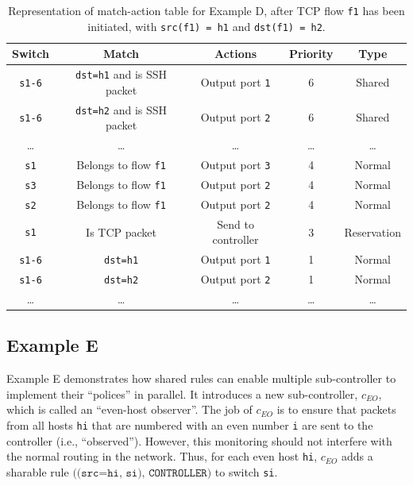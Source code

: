 \documentclass{article}
\begin{document}
\begin{table}
\begin{center}
\begin{tabular}{|c|c|c|c|c|}
\hline
Switch & Match & Actions & Priority & Type \\
\hline
\texttt{s1-6} & \texttt{dst=h1} and is SSH packet & Output port \texttt{1} & 6 & Shared \\
\hline
\texttt{s1-6} & \texttt{dst=h2} and is SSH packet & Output port \texttt{2} & 6 & Shared \\
\hline
\dots & \dots & \dots & \dots & \dots \\
\hline
\texttt{s1} & Belongs to flow \texttt{f1} & Output port \texttt{3} & 4 & Normal \\
\hline
\texttt{s3} & Belongs to flow \texttt{f1} & Output port \texttt{2} & 4 & Normal \\
\hline
\texttt{s2} & Belongs to flow \texttt{f1} & Output port \texttt{2} & 4 & Normal \\
\hline
\texttt{s1} & Is TCP packet & Send to controller & 3 & Reservation \\
\hline
\texttt{s1-6} & \texttt{dst=h1} & Output port \texttt{1} & 1 & Normal \\
\hline
\texttt{s1-6} & \texttt{dst=h2} & Output port \texttt{2} & 1 & Normal\\
\hline
\dots & \dots & \dots & \dots & \dots \\
\hline
\end{tabular}
\end{center}
\caption{Representation of match-action table for Example D, after
TCP flow \texttt{f1} has been initiated, with \texttt{src(f1) = h1} and
\texttt{dst(f1) = h2}.}
\label{table_D}
\end{table}

\subsection{Example E} \label{Ex_E}

Example E demonstrates how shared rules can enable multiple sub-controller
to implement their ``polices'' in parallel. It introduces a new
sub-controller, $c_{EO}$, which is called an ``even-host observer''.
The job of $c_{EO}$ is to ensure that packets from all hosts \texttt{hi} 
that are numbered with an even number \texttt{i} are sent to the controller
(i.e., ``observed''). However, this monitoring should not interfere with
the normal routing in the network.
Thus, for each even host \texttt{hi}, $c_{EO}$ adds a sharable rule
$\texttt{((src=hi, si), CONTROLLER)}$ to switch \texttt{si}.
\end{document}
